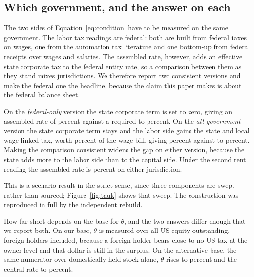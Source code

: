 \subsection{Which government, and the answer on each}

The two sides of Equation~\eqref{eq:condition} have to be measured on the same government. The
labor tax readings are federal: both are built from federal taxes on wages, one from the
automation tax literature and one bottom-up from federal receipts over wages and salaries. The
assembled rate, however, adds an effective state corporate tax to the federal entity rate, so a
comparison between them as they stand mixes jurisdictions. We therefore report two consistent
versions and make the federal one the headline, because the claim this paper makes is about the
federal balance sheet.

On the \emph{federal-only} version the state corporate term is set to zero, giving an assembled
rate of  percent against a required  to
 percent. On the \emph{all-government} version the state corporate term
stays and the labor side gains the state and local wage-linked tax, worth
 percent of the wage bill, giving  percent
against  to  percent. Making the
comparison consistent widens the gap on either version, because the state adds more to the labor
side than to the capital side. Under the second rent reading the assembled rate is
 percent on either jurisdiction.

This is a scenario result in the strict sense, since three components are swept rather than
sourced; Figure~\ref{fig:tauk} shows that sweep. The construction was reproduced in full by the
independent rebuild.

How far short depends on the base for $\theta$, and the two answers differ enough that we report
both. On our base, $\theta$ is measured over all US equity outstanding, foreign holders included,
because a foreign holder bears close to no US tax at the owner level and that dollar is still in
the surplus. On the alternative base, the same numerator over domestically held stock alone,
$\theta$ rises to  percent and the central rate to 
percent.


